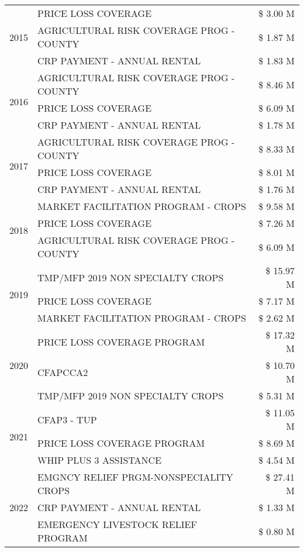 \begin{tabular}{llr}
\multirow[t]{3}{*}{2015} & PRICE LOSS COVERAGE & \$ 3.00 M \\
 & AGRICULTURAL RISK COVERAGE PROG - COUNTY & \$ 1.87 M \\
 & CRP PAYMENT - ANNUAL RENTAL & \$ 1.83 M \\
\cline{1-3}
\multirow[t]{3}{*}{2016} & AGRICULTURAL RISK COVERAGE PROG - COUNTY & \$ 8.46 M \\
 & PRICE LOSS COVERAGE & \$ 6.09 M \\
 & CRP PAYMENT - ANNUAL RENTAL & \$ 1.78 M \\
\cline{1-3}
\multirow[t]{3}{*}{2017} & AGRICULTURAL RISK COVERAGE PROG - COUNTY & \$ 8.33 M \\
 & PRICE LOSS COVERAGE & \$ 8.01 M \\
 & CRP PAYMENT - ANNUAL RENTAL & \$ 1.76 M \\
\cline{1-3}
\multirow[t]{3}{*}{2018} & MARKET FACILITATION PROGRAM - CROPS & \$ 9.58 M \\
 & PRICE LOSS COVERAGE & \$ 7.26 M \\
 & AGRICULTURAL RISK COVERAGE PROG - COUNTY & \$ 6.09 M \\
\cline{1-3}
\multirow[t]{3}{*}{2019} & TMP/MFP 2019 NON SPECIALTY CROPS & \$ 15.97 M \\
 & PRICE LOSS COVERAGE & \$ 7.17 M \\
 & MARKET FACILITATION PROGRAM - CROPS & \$ 2.62 M \\
\cline{1-3}
\multirow[t]{3}{*}{2020} & PRICE LOSS COVERAGE PROGRAM & \$ 17.32 M \\
 & CFAPCCA2 & \$ 10.70 M \\
 & TMP/MFP 2019 NON SPECIALTY CROPS & \$ 5.31 M \\
\cline{1-3}
\multirow[t]{3}{*}{2021} & CFAP3 - TUP & \$ 11.05 M \\
 & PRICE LOSS COVERAGE PROGRAM & \$ 8.69 M \\
 & WHIP PLUS 3 ASSISTANCE & \$ 4.54 M \\
\cline{1-3}
\multirow[t]{3}{*}{2022} & EMGNCY RELIEF PRGM-NONSPECIALITY CROPS & \$ 27.41 M \\
 & CRP PAYMENT - ANNUAL RENTAL & \$ 1.33 M \\
 & EMERGENCY LIVESTOCK RELIEF PROGRAM & \$ 0.80 M \\
\cline{1-3}
\bottomrule
\end{tabular}
